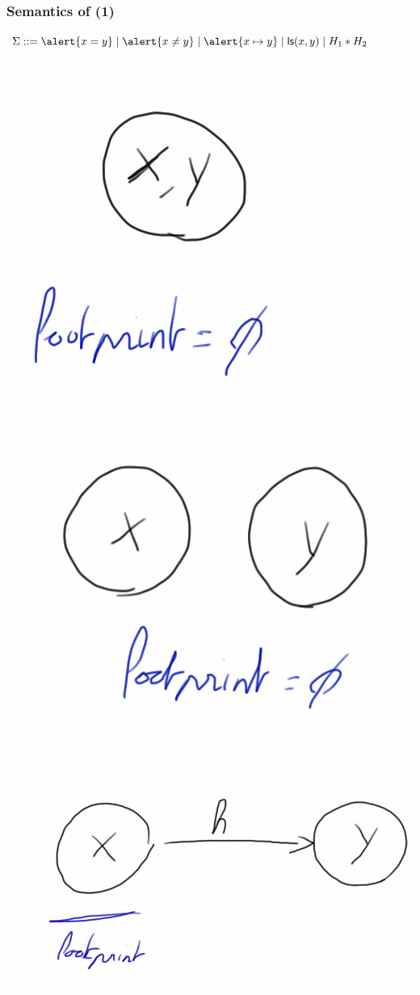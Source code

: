 \documentclass{beamer}
\begin{document}
\begin{frame}
  \frametitle{Semantics of \JoshLogic (1)}
  $\Sigma ::= \alert{x = y} \mid \alert{x \neq y} \mid \alert{x \mapsto y} \mid \liste{x}{y} \mid H_1 * H_2$

\includegraphics[scale=0.20]{resources/sl_eq.png}
\hfill
\includegraphics[scale=0.20]{resources/sl_neq.png}

\begin{center}
\includegraphics[scale=0.20]{resources/sl_pts.png}
\end{center}


\end{frame}
\end{document}
